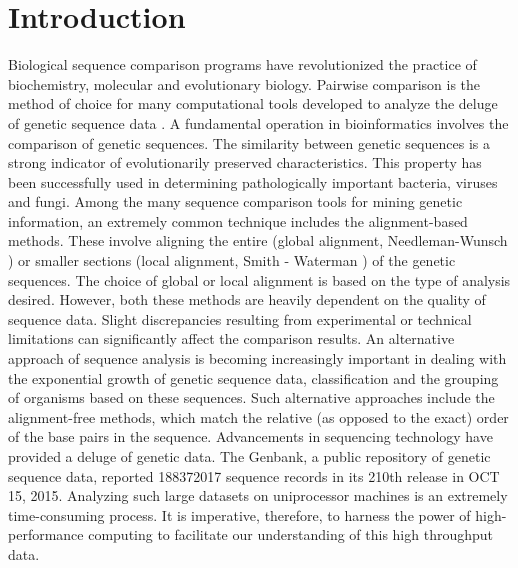 \documentclass[journal,twoside]{IEEEtran}
\begin{document}
\section{Introduction}
Biological sequence comparison programs have revolutionized the practice of biochemistry, molecular and evolutionary biology. Pairwise comparison is the method of choice for many computational tools developed to analyze the deluge of genetic sequence data \cite{bastola}. 
A fundamental operation in bioinformatics involves the comparison of genetic sequences. The similarity between genetic sequences is a strong indicator of evolutionarily preserved characteristics. This property has been successfully used in determining pathologically important bacteria, viruses and fungi.
Among the many sequence comparison tools for mining genetic information, an extremely common technique includes the alignment-based methods. These involve aligning the entire (global alignment, Needleman-Wunsch \cite{needleman}) or smaller sections (local alignment, Smith - Waterman \cite{waterman}) of the genetic sequences. The choice of global or local alignment is based on the type of analysis desired. However, both these methods are heavily dependent on the quality of sequence data. Slight discrepancies resulting from experimental or technical limitations can significantly affect the comparison results. 
An alternative approach of sequence analysis is becoming increasingly important in dealing with the exponential growth of genetic sequence data, classification and the grouping of organisms based on these sequences. Such alternative approaches include the alignment-free methods, which match the relative (as opposed to the exact) order of the base pairs in the sequence.  Advancements in sequencing technology have provided a deluge of genetic data. The Genbank, a public repository of genetic sequence data, reported 188372017 sequence records in its 210th release in OCT 15, 2015. Analyzing such large datasets on uniprocessor machines is an extremely time-consuming process. It is imperative, therefore, to harness the power of high-performance computing to facilitate our understanding of this high throughput data.
\end{document}
